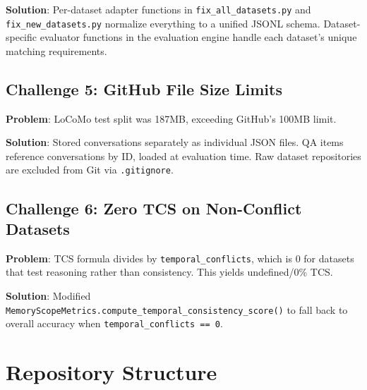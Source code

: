 \documentclass[11pt,a4paper]{article}
\begin{document}
\textbf{Solution}: Per-dataset adapter functions in \texttt{fix\_all\_datasets.py} and \texttt{fix\_new\_datasets.py} normalize everything to a unified JSONL schema. Dataset-specific evaluator functions in the evaluation engine handle each dataset's unique matching requirements.

\subsection{Challenge 5: GitHub File Size Limits}
\textbf{Problem}: LoCoMo test split was 187MB, exceeding GitHub's 100MB limit.

\textbf{Solution}: Stored conversations separately as individual JSON files. QA items reference conversations by ID, loaded at evaluation time. Raw dataset repositories are excluded from Git via \texttt{.gitignore}.

\subsection{Challenge 6: Zero TCS on Non-Conflict Datasets}
\textbf{Problem}: TCS formula divides by \texttt{temporal\_conflicts}, which is 0 for datasets that test reasoning rather than consistency. This yields undefined/0\% TCS.

\textbf{Solution}: Modified \texttt{MemoryScopeMetrics.compute\_temporal\_consistency\_score()} to fall back to overall accuracy when \texttt{temporal\_conflicts == 0}.

\section{Repository Structure}
\end{document}
